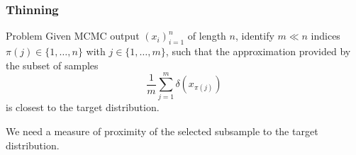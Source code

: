 \documentclass{beamer}
\begin{document}
\begin{frame}
\frametitle{Thinning}

\begin{block}{Problem}
Given MCMC output $(x_i)_{i=1}^n$ of length $n$, identify $m \ll n$ indices $\pi(j) \in \{1,\dots, n\}$ with $j\in\{1, \dots, m\}$, such that the approximation provided by the subset of samples
\begin{equation*}
\frac{1}{m} \sum_{j=1}^m \delta(x_{\pi(j)})
\label{eq:thinned-sample}
\end{equation*}
is closest to the target distribution.
\end{block}

We need a measure of proximity of the selected subsample to the target distribution.

\end{frame}
\end{document}
